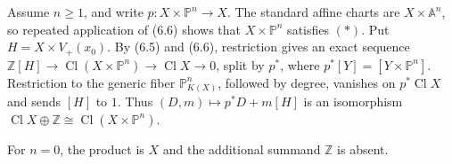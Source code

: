 Assume $n\geq1$, and write $p:X\times\mathbb P^n\to X$. The standard affine charts are $X\times\mathbb A^n$, so repeated application of (6.6) shows that $X\times\mathbb P^n$ satisfies $(*)$. Put $H=X\times V_+(x_0)$. By (6.5) and (6.6), restriction gives an exact sequence $\mathbb Z[H]\to\operatorname{Cl}(X\times\mathbb P^n)\to\operatorname{Cl}X\to0$, split by $p^*$, where $p^*[Y]=[Y\times\mathbb P^n]$. Restriction to the generic fiber $\mathbb P^n_{K(X)}$, followed by degree, vanishes on $p^*\operatorname{Cl}X$ and sends $[H]$ to $1$. Thus $(D,m)\mapsto p^*D+m[H]$ is an isomorphism $\operatorname{Cl}X\oplus\mathbb Z\cong\operatorname{Cl}(X\times\mathbb P^n)$.

For $n=0$, the product is $X$ and the additional summand $\mathbb Z$ is absent.
